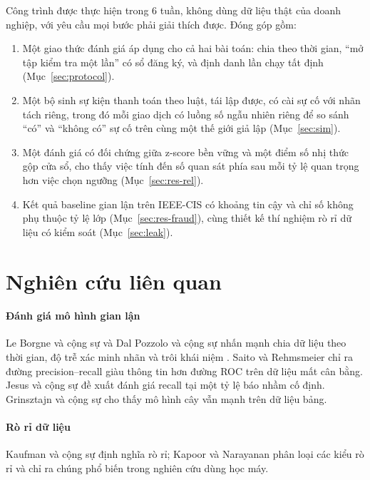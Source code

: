 \documentclass[11pt,a4paper]{article}
\theoremstyle{definition}
\theoremstyle{remark}
\numberwithin{equation}{section}
\begin{document}
Công trình được thực hiện trong 6 tuần, không dùng dữ liệu thật của doanh nghiệp, với yêu cầu mọi bước phải giải thích được. Đóng góp gồm:
\begin{enumerate}
  \item Một giao thức đánh giá áp dụng cho cả hai bài toán: chia theo thời gian, ``mở tập kiểm tra một lần'' có sổ đăng ký, và định danh lần chạy tất định (Mục~\ref{sec:protocol}).
  \item Một bộ sinh sự kiện thanh toán theo luật, tái lập được, có cài sự cố với nhãn tách riêng, trong đó mỗi giao dịch có luồng số ngẫu nhiên riêng để so sánh ``có'' và ``không có'' sự cố trên cùng một thế giới giả lập (Mục~\ref{sec:sim}).
  \item Một đánh giá có đối chứng giữa z-score bền vững và một điểm số nhị thức gộp cửa sổ, cho thấy việc tính đến số quan sát phía sau mỗi tỷ lệ quan trọng hơn việc chọn ngưỡng (Mục~\ref{sec:res-rel}).
  \item Kết quả baseline gian lận trên IEEE-CIS có khoảng tin cậy và chỉ số không phụ thuộc tỷ lệ lớp (Mục~\ref{sec:res-fraud}), cùng thiết kế thí nghiệm rò rỉ dữ liệu có kiểm soát (Mục~\ref{sec:leak}).
\end{enumerate}

\section{Nghiên cứu liên quan}
\paragraph{Đánh giá mô hình gian lận} Le Borgne và cộng sự \cite{handbook} và Dal Pozzolo và cộng sự \cite{dalpozzolo} nhấn mạnh chia dữ liệu theo thời gian, độ trễ xác minh nhãn và trôi khái niệm \cite{gama}. Saito và Rehmsmeier \cite{saito} chỉ ra đường precision--recall giàu thông tin hơn đường ROC trên dữ liệu mất cân bằng. Jesus và cộng sự \cite{jesus} đề xuất đánh giá recall tại một tỷ lệ báo nhầm cố định. Grinsztajn và cộng sự \cite{grinsztajn} cho thấy mô hình cây vẫn mạnh trên dữ liệu bảng.

\paragraph{Rò rỉ dữ liệu} Kaufman và cộng sự \cite{kaufman} định nghĩa rò rỉ; Kapoor và Narayanan \cite{kapoor} phân loại các kiểu rò rỉ và chỉ ra chúng phổ biến trong nghiên cứu dùng học máy.
\end{document}
